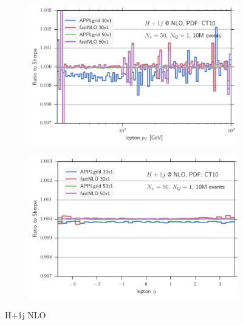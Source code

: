 \begin{figure}
\begin{subfigure}[]{0.49\textwidth}
	\includegraphics[width=\textwidth]{images/hjnlo_lpt_50v30.pdf}
\end{subfigure}
\hfill
\begin{subfigure}[]{0.49\textwidth}
	\includegraphics[width=\textwidth]{images/hjnlo_leta_50v30.pdf}
\end{subfigure}
\caption{H+1j NLO}
\label{fig:hjnlo_validation}
\end{figure}
%
